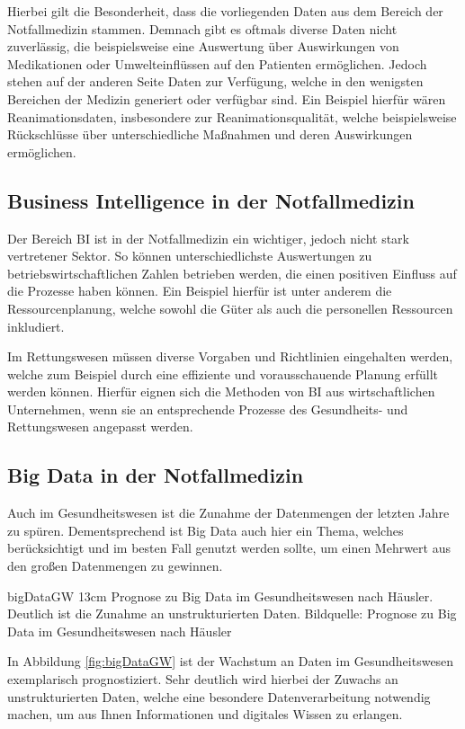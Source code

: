 Hierbei gilt die Besonderheit, dass die vorliegenden Daten aus dem Bereich der Notfallmedizin stammen.
Demnach gibt es oftmals diverse Daten nicht zuverlässig, die beispielsweise eine Auswertung über Auswirkungen von Medikationen oder Umwelteinflüssen auf den Patienten ermöglichen.
Jedoch stehen auf der anderen Seite Daten zur Verfügung, welche in den wenigsten Bereichen der Medizin generiert oder verfügbar sind.
Ein Beispiel hierfür wären Reanimationsdaten, insbesondere zur Reanimationsqualität, welche beispielsweise Rückschlüsse über unterschiedliche Maßnahmen und deren Auswirkungen ermöglichen.

\subsection{Business Intelligence in der Notfallmedizin}
Der Bereich \gls{BI} ist in der Notfallmedizin ein wichtiger, jedoch nicht stark vertretener Sektor.
So können unterschiedlichste Auswertungen zu betriebswirtschaftlichen Zahlen betrieben werden, die einen positiven Einfluss auf die Prozesse haben können.
Ein Beispiel hierfür ist unter anderem die Ressourcenplanung, welche sowohl die Güter als auch die personellen Ressourcen inkludiert.

Im Rettungswesen müssen diverse Vorgaben und Richtlinien eingehalten werden, welche zum Beispiel durch eine effiziente und vorausschauende Planung erfüllt werden können.
Hierfür eignen sich die Methoden von \gls{BI} aus wirtschaftlichen Unternehmen, wenn sie an entsprechende Prozesse des Gesundheits- und Rettungswesen angepasst werden.


\subsection{Big Data in der Notfallmedizin}

Auch im Gesundheitswesen ist die Zunahme der Datenmengen der letzten Jahre zu spüren.
Dementsprechend ist \glqq Big Data\grqq{} auch hier ein Thema, welches berücksichtigt und im besten Fall genutzt werden sollte, um einen Mehrwert aus den großen Datenmengen zu gewinnen.

\bild
{bigDataGW}
{13cm}
{Prognose zu Big Data im Gesundheitswesen nach Häusler. Deutlich ist die Zunahme an unstrukturierten Daten. Bildquelle: \cite[S.45]{Hausler.2018}}
{Prognose zu Big Data im Gesundheitswesen nach Häusler}

In Abbildung \ref{fig:bigDataGW} ist der Wachstum an Daten im Gesundheitswesen exemplarisch prognostiziert.
Sehr deutlich wird hierbei der Zuwachs an unstrukturierten Daten, welche eine besondere Datenverarbeitung notwendig machen, um aus Ihnen Informationen und digitales Wissen zu erlangen.


